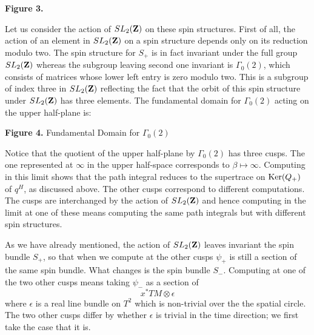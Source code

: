 \centerline{\quad}
\centerline{\epsfxsize=3in}
\centerline{\bf Figure 3.}
\centerline{\quad}




Let us consider the action of $SL_2({\bf Z})$ on these spin
structures. First of all, the action of an element in $SL_2({\bf Z})$
on a spin structure depends only on its reduction modulo two. The spin
structure for $S_+$ is in fact invariant under the full group
$SL_2({\bf Z})$ whereas the subgroup leaving second one invariant is
$\Gamma_0(2)$, which consists of
matrices whose lower left entry is zero modulo two. 
This is a subgroup of index three
in $SL_2({\bf Z})$ reflecting the fact that the orbit of this spin
structure under $SL_2({\bf Z})$ has three elements.
The fundamental domain for $\Gamma_0(2)$ acting on the upper
half-plane is:


\centerline{\quad}
\centerline{\epsfxsize=1.5in}
\centerline{{\bf Figure 4.} Fundamental Domain for $\Gamma_0(2)$}
\centerline{\quad}




Notice that the quotient of the upper half-plane by $\Gamma_0(2)$ has
three cusps.
The one represented at $\infty$ in the upper half-space corresponds to
$\beta\mapsto\infty$. Computing in this limit shows that the path
integral reduces to the supertrace on ${\rm Ker}(Q_+)$ of $q^H$, as
discussed above. The other cusps correspond to different computations.
The  cusps are interchanged by the action of $SL_2({\bf Z})$
and hence computing in the limit at one of these means computing  the
same path integrals but with different  spin structures.

As we have already mentioned, the action of $SL_2({\bf Z})$ leaves
invariant the spin bundle $S_+$, so that when we compute at the other
cusps $\psi_+$ is still a section of the same spin bundle.
What changes is the spin bundle $S_-$.
Computing at one of the two other cusps means taking $\psi_-$ as a
section of
$$x^*TM\otimes \epsilon$$
where $\epsilon$ is a real line bundle on $T^2$ which is non-trivial
over the  the spatial  circle.  The two other cusps differ by whether
$\epsilon$ is trivial in the time direction; we first take the
case that it is.

